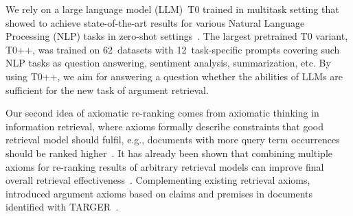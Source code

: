 %
We rely on a large language model (LLM)~T0 trained in multitask setting that showed to achieve state-of-the-art results for various Natural Language Processing (NLP) tasks in zero-shot settings~\cite{SanhWRBSACSLRDBXTSSKCNDCJWMSYPBWNRSSFFTBGBWR2021}. The largest pretrained T0 variant, T0++, was trained on 62~datasets with 12~task-specific prompts covering such NLP tasks as question answering, sentiment analysis, summarization, etc. By using T0++, we aim for answering a question whether the abilities of LLMs are sufficient for the new task of argument retrieval.

Our second idea of axiomatic re-ranking comes from axiomatic thinking in information retrieval, where axioms formally describe constraints that good retrieval model should fulfil, e.g., documents with more query term occurrences should be ranked higher~\citet{FangTZ2004}. It has already been shown that combining multiple axioms for re-ranking results of arbitrary retrieval models can improve final overall retrieval effectiveness~\cite{HagenVGS2016}. Complementing existing retrieval axioms, \citet{BondarenkoHVSPB2018} introduced argument axioms based on claims and premises in documents identified with TARGER~\cite{ChernodubOHBHBP2019}.

